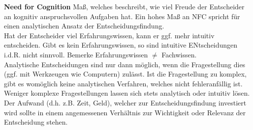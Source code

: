 \textbf{Need for Cognition} Maß, welches beschreibt, wie viel Freude der Entscheider an kognitiv anspruchsvollen Aufgaben hat. Ein hohes Maß an NFC spricht für einen analytischen Ansatz der Entscheidungsfindung.\\
Hat der Entscheider viel Erfahrungswissen, kann er ggf. mehr intuitiv entscheiden. Gibt es kein Erfahrungswissen, so sind intuitive ENtscheidungen i.d.R. nicht sinnvoll. Bemerke Erfahrungswissen \(\neq\) Fachwissen.\\
Analytische Entscheidungen sind nur dann möglich, wenn die Fragestellung dies (ggf. mit Werkzeugen wie Computern) zulässt. Ist die Fragestellung zu komplex, gibt es womöglich keine analytischen Verfahren, welches nicht fehleranfällig ist. Weniger komplexe Fragestellungen lassen sich stets analytisch oder intuitiv lösen.\\
Der Aufwand (d.h. z.B.  Zeit, Geld), welcher zur Entscheidungsfindung investiert wird sollte in einem angemessenen Verhältnis zur Wichtigkeit oder Relevanz der Entscheidung stehen.\\

